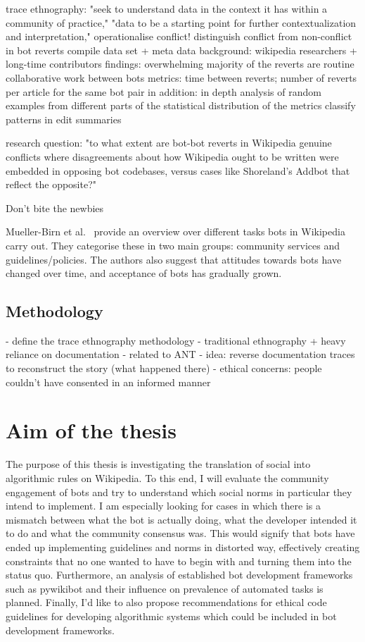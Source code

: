 \documentclass[pdftex,a4paper,11pt]{scrartcl}
\begin{document}
trace ethnography: "seek to understand data in the context it has within a community of practice," "data to be a starting point for further contextualization and interpretation,"
operationalise conflict!
distinguish conflict from non-conflict in bot reverts
compile data set + meta data
background: wikipedia researchers + long-time contributors
findings: overwhelming majority of the reverts are routine collaborative work between bots
metrics: time between reverts; number of reverts per article for the same bot pair
in addition: in depth analysis of random examples from different parts of the statistical distribution of the metrics
classify patterns in edit summaries

research question: "to what extent are bot-bot reverts
in Wikipedia genuine conflicts where disagreements about how Wikipedia ought to be written were
embedded in opposing bot codebases, versus cases like Shoreland’s Addbot that reflect the opposite?"

\cite{HalKitRied2011}
Don't bite the newbies

\cite{MuellerBirn2014}
  Mueller-Birn et al.~\cite{MuellerBirn2014} provide an overview over different tasks bots in Wikipedia carry out.
  They categorise these in two main groups: community services and guidelines/policies.
  The authors also suggest that attitudes towards bots have changed over time, and acceptance of bots has gradually grown.


\subsection{Methodology}
\cite{GeiRib2011}
- define the trace ethnography methodology
- traditional ethnography + heavy reliance on documentation
- related to ANT
- idea: reverse documentation traces to reconstruct the story (what happened
  there)
- ethical concerns: people couldn't have consented in an informed manner


\section{Aim of the thesis}
The purpose of this thesis is investigating the translation of social into algorithmic rules on Wikipedia.
To this end, I will evaluate the community engagement of bots and try to understand which social norms in particular they intend to implement.
I am especially looking for cases in which there is a mismatch between what the bot is actually doing, what the developer intended it to do and what the community consensus was.
This would signify that bots have ended up implementing guidelines and norms in distorted way, effectively creating constraints that no one wanted to have to begin with and turning them into the status quo.
Furthermore, an analysis of established bot development frameworks such as pywikibot and their influence on prevalence of automated tasks is planned.
Finally, I'd like to also propose recommendations for ethical code guidelines for developing algorithmic systems which could be included in bot development frameworks.
\end{document}
